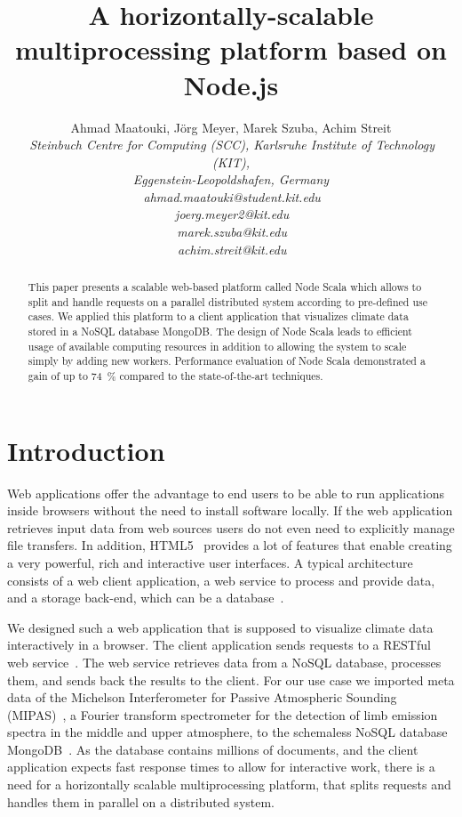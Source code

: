 \documentclass[10pt,conference,letterpaper]{IEEEtran}
\title{A horizontally-scalable multiprocessing platform based on Node.js}
\author{{Ahmad Maatouki{\small }, J\"org Meyer{\small }, Marek Szuba{\small }, Achim Streit{\small } }\vspace{1.6mm}\\
\fontsize{10}{10}\selectfont\itshape
\,Steinbuch Centre for Computing (SCC), Karlsruhe Institute of Technology (KIT),\\
Eggenstein-Leopoldshafen, Germany\\
\fontsize{9}{9}\selectfont\ttfamily\upshape
\,ahmad.maatouki@student.kit.edu\\
\,joerg.meyer2@kit.edu\\
\,marek.szuba@kit.edu\\
\,achim.streit@kit.edu\vspace{1.2mm}\\
\fontsize{10}{10}\selectfont\rmfamily\itshape
\fontsize{9}{9}\selectfont\ttfamily\upshape
}
\begin{document}
\maketitle
\begin{abstract}
  This paper presents a scalable web-based platform called Node Scala which
  allows to split and handle requests on a parallel distributed system
  according to pre-defined use cases. We applied this platform to a
  client application that visualizes climate data stored in a NoSQL
  database MongoDB. The design of Node Scala leads to efficient usage
  of available computing resources in addition to allowing the system
  to scale simply by adding new workers. Performance evaluation of
  Node Scala demonstrated a gain of up to 74~\% compared to the
  state-of-the-art techniques.

\end{abstract}



\section{Introduction}
Web applications offer the advantage to end users to be able to run applications inside browsers without the need to install software locally. If the web application retrieves input data from web sources users do not even need to explicitly manage file transfers. In addition, HTML5~\cite{html5} provides a lot of features that enable creating a very powerful, rich and interactive user interfaces. A typical architecture consists of a web client application, a web service to process and provide data, and a storage back-end, which can be a database~\cite{yue2004underlying}.

We designed such a web application that is supposed to visualize climate data interactively in a browser. The client application sends requests to a RESTful web service~\cite{Fielding:2002:PDM:514183.514185}. The web service retrieves data from a NoSQL database, processes them, and sends back the results to the client. For our use case we imported meta data of the Michelson Interferometer for Passive Atmospheric Sounding (MIPAS)~\cite{mipas}, a Fourier transform spectrometer for the detection of limb emission spectra in the middle and upper atmosphere, to the schemaless NoSQL database MongoDB~\cite{Ameri14,mongodb}. As the database contains millions of documents, and the client application expects fast response times to allow for interactive work, there is a need for a horizontally scalable multiprocessing platform, that splits requests and handles them in parallel on a distributed system.
\end{document}
